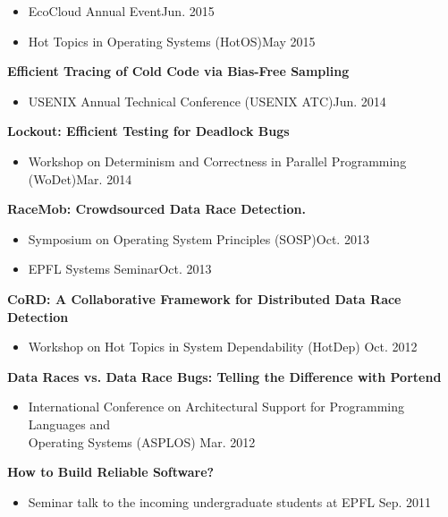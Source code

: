 \documentclass[10pt]{article}
\newcommand{\mysub}[3]{\textbf{#1} {#2} \hfill {\em #3}}
\begin{document}
\begin{itemize}
\setlength\itemsep{0em}
\item{EcoCloud Annual Event}\hfill Jun. 2015
\item{Hot Topics in Operating Systems (HotOS)}\hfill May 2015
\end{itemize}
\vspace{-2mm}
\mysub{Efficient Tracing of Cold Code via Bias-Free Sampling}{}{} 
\vspace{-2mm}
\begin{itemize}
\setlength\itemsep{0em}
\item{USENIX Annual Technical Conference (USENIX ATC)}\hfill Jun. 2014
\end{itemize}
\vspace{-2mm}
\mysub{Lockout: Efficient Testing for Deadlock Bugs}{}{} 
\vspace{-2mm}
\begin{itemize}
\setlength\itemsep{0em}
\item{Workshop on Determinism and Correctness in Parallel Programming (WoDet)}\hfill Mar. 2014
\end{itemize}
\vspace{-2mm}
\mysub{RaceMob: Crowdsourced Data Race Detection.}{}{} 
\vspace{-2mm}
\begin{itemize}
\setlength\itemsep{0em}
\item{Symposium on Operating System Principles (SOSP)}\hfill Oct. 2013
\item{EPFL Systems Seminar}\hfill Oct. 2013
\end{itemize}
\vspace{-2mm}
\mysub{CoRD: A Collaborative Framework for Distributed Data Race Detection}{}{} 
\vspace{-2mm}
\begin{itemize}
\setlength\itemsep{0em}
\item{Workshop on Hot Topics in System Dependability (HotDep)} \hfill Oct. 2012
\end{itemize}
\vspace{-2mm}
\mysub{Data Races vs. Data Race Bugs: Telling the Difference with Portend}{}{} 
\vspace{-2mm}
\begin{itemize}
\setlength\itemsep{0em}
\item{International Conference on Architectural Support for Programming Languages and \\ Operating Systems (ASPLOS)} \hfill Mar. 2012
\end{itemize}
\vspace{-2mm}
\mysub{How to Build Reliable Software?}{}{} 
\vspace{-2mm}
\begin{itemize}
\setlength\itemsep{0em}
\item{Seminar talk to the incoming undergraduate students at EPFL} \hfill  Sep. 2011
\end{itemize}
\end{document}
